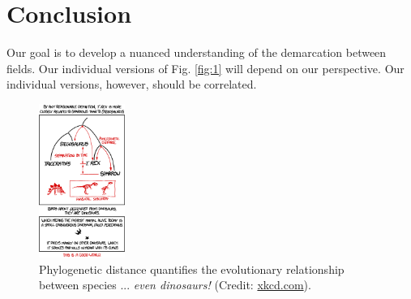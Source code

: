\documentclass[12pt]{article}
\begin{document}
\section{Conclusion}

Our goal is to develop a nuanced understanding of the demarcation between fields.  Our individual versions of Fig. \ref{fig:1} will depend on our perspective.  Our individual versions, however, should be correlated.

\begin{figure}[hb]
\centering
\includegraphics[width=0.25\textwidth]{figures/birds_and_dinosaurs.png}
\caption{\label{fig:2} Phylogenetic distance quantifies the evolutionary relationship between species ... \textit{even dinosaurs!} (Credit: \url{xkcd.com}).}
\end{figure}



\end{document}
